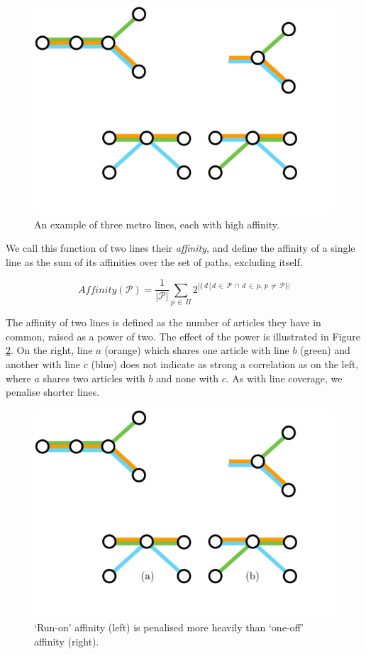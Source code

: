 \begin{figure}[htbp!]
	\centering
	\includegraphics[width=.4\textwidth]{img/implementation/lowaffinity.pdf}
	\caption{An example of three metro lines, each with high affinity.}
	\label{fig:lowaffinity}
\end{figure}

We call this function of two lines their \textit{affinity}, and define the affinity of a single line as the sum of its affinities over the set of paths, excluding itself.

\begin{equation}
	Affinity(\mathcal{P}) = \frac{1}{|\mathcal{P}|} \sum_{p\,\in{\,\Pi}} 2^{|\{\,d\,|\,d\,\in\,{\mathcal{P}}\,\cap\,d\,\in\,{p},\,p\,\neq\,\mathcal{P}\}|}
\end{equation}

The affinity of two lines is defined as the number of articles they have in common, raised as a power of two. The effect of the power is illustrated in Figure \ref{fig:abcaffinity}. On the right, line $a$ (orange) which shares one article with line $b$ (green) and another with line $c$ (blue) does not indicate as strong a correlation as on the left, where $a$ shares two articles with $b$ and none with $c$. As with line coverage, we penalise shorter lines.

\begin{figure}[htbp!]
	\centering
	\includegraphics[width=.8\textwidth]{img/implementation/abcaffinity.pdf}
	\caption{`Run-on' affinity (left) is penalised more heavily than `one-off' affinity (right).}
	\label{fig:abcaffinity}
\end{figure}

